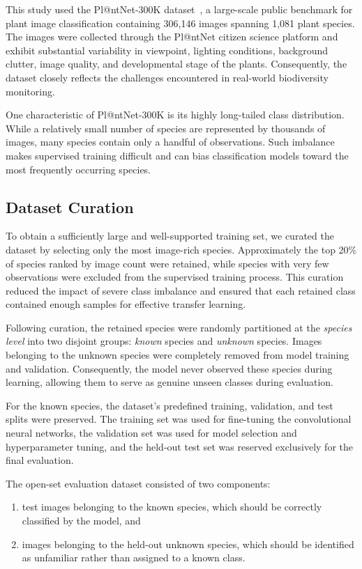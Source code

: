\documentclass[11pt]{article}
\begin{document}
This study used the Pl@ntNet-300K dataset~\cite{garcin2021plantnet}, a large-scale public benchmark for plant image classification containing 306,146 images spanning 1,081 plant species. The images were collected through the Pl@ntNet citizen science platform and exhibit substantial variability in viewpoint, lighting conditions, background clutter, image quality, and developmental stage of the plants. Consequently, the dataset closely reflects the challenges encountered in real-world biodiversity monitoring.

One characteristic of Pl@ntNet-300K is its highly long-tailed class distribution. While a relatively small number of species are represented by thousands of images, many species contain only a handful of observations. Such imbalance makes supervised training difficult and can bias classification models toward the most frequently occurring species.

\subsection{Dataset Curation}

To obtain a sufficiently large and well-supported training set, we curated the dataset by selecting only the most image-rich species. Approximately the top 20\% of species ranked by image count were retained, while species with very few observations were excluded from the supervised training process. This curation reduced the impact of severe class imbalance and ensured that each retained class contained enough samples for effective transfer learning.

Following curation, the retained species were randomly partitioned at the \emph{species level} into two disjoint groups: \textit{known} species and \textit{unknown} species. Images belonging to the unknown species were completely removed from model training and validation. Consequently, the model never observed these species during learning, allowing them to serve as genuine unseen classes during evaluation.

For the known species, the dataset's predefined training, validation, and test splits were preserved. The training set was used for fine-tuning the convolutional neural networks, the validation set was used for model selection and hyperparameter tuning, and the held-out test set was reserved exclusively for the final evaluation.

The open-set evaluation dataset consisted of two components:
\begin{enumerate}
    \item test images belonging to the known species, which should be correctly classified by the model, and
    \item images belonging to the held-out unknown species, which should be identified as unfamiliar rather than assigned to a known class.
\end{enumerate}
\end{document}
